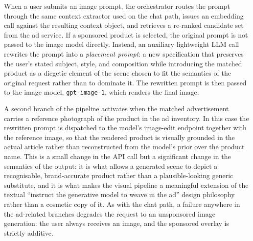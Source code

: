When a user submits an image prompt, the orchestrator routes the
prompt through the same context extractor used on the chat path,
issues an embedding call against the resulting context object, and
retrieves a re-ranked candidate set from the ad service. If a
sponsored product is selected, the original prompt is not passed to
the image model directly. Instead, an auxiliary lightweight LLM call
rewrites the prompt into a \emph{placement prompt}: a new
specification that preserves the user's stated subject, style, and
composition while introducing the matched product as a diegetic
element of the scene chosen to fit the semantics of the
original request rather than to dominate it. The rewritten prompt is
then passed to the image model, \texttt{gpt-image-1}, which renders
the final image.

A second branch of the pipeline activates when the matched
advertisement carries a reference photograph of the product in the ad
inventory. In this case the rewritten prompt is dispatched to the
model's image-edit endpoint together with the reference image, so
that the rendered product is visually grounded in the actual article
rather than reconstructed from the model's prior over the product
name. This is a small change in the API call but a significant change
in the semantics of the output: it is what allows a generated scene
to depict a recognisable, brand-accurate product rather than a
plausible-looking generic substitute, and it is what makes the visual
pipeline a meaningful extension of the textual ``instruct the
generative model to weave in the ad'' design philosophy rather than a
cosmetic copy of it. As with the chat path, a failure anywhere in the
ad-related branches degrades the request to an unsponsored image
generation: the user always receives an image, and the sponsored
overlay is strictly additive.